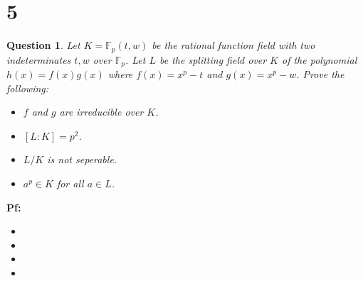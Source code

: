 \documentclass{article}
\newtheorem{question}{Question}
\begin{document}
\section*{5}
\begin{myBox}[]{}
    \begin{question}
        Let $K=\mathbb{F}_p(t,w)$ be the rational function field with two indeterminates $t,w$ over $\mathbb{F}_p$. Let $L$ be the splitting field over $K$ of the polynomial $h(x)=f(x)g(x)$ where $f(x)=x^p-t$ and $g(x)=x^p-w$. Prove the following:
        \begin{itemize}
            \item[(a)] $f$ and $g$ are irreducible over $K$.
            \item[(b)] $[L:K]=p^2$.
            \item[(c)] $L/K$ is not seperable.
            \item[(d)] $a^p\in K$ for all $a\in L$.
        \end{itemize}
    \end{question}
\end{myBox}

\textbf{Pf:}

\begin{itemize}
    \item[(a)]
    \item[(b)]
    \item[(c)]
    \item[(d)]   
\end{itemize}
\end{document}
